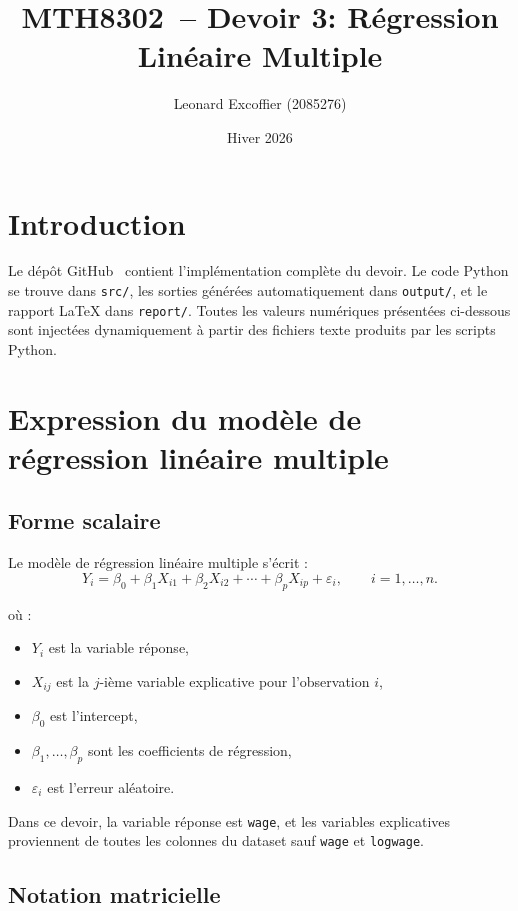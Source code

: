 \documentclass[12pt,letterpaper]{article}
\title{MTH8302~-- Devoir 3: Régression Linéaire Multiple}
\author{Leonard Excoffier (2085276)}
\date{Hiver 2026}
\begin{document}
\maketitle
\tableofcontents

\section*{Introduction}

Le dépôt GitHub~\cite{repo} contient l'implémentation complète du devoir.
Le code Python se trouve dans \texttt{src/}, les sorties générées automatiquement dans \texttt{output/}, et le rapport LaTeX dans \texttt{report/}.
Toutes les valeurs numériques présentées ci-dessous sont injectées dynamiquement à partir des fichiers texte produits par les scripts Python.

\section{Expression du modèle de régression linéaire multiple}

\subsection{Forme scalaire}

Le modèle de régression linéaire multiple s'écrit :
\[
Y_i = \beta_0 + \beta_1 X_{i1} + \beta_2 X_{i2} + \cdots + \beta_p X_{ip} + \varepsilon_i,
\qquad i = 1, \ldots, n.
\]

où :
\begin{itemize}
    \item $Y_i$ est la variable réponse,
    \item $X_{ij}$ est la $j$-ième variable explicative pour l'observation $i$,
    \item $\beta_0$ est l'intercept,
    \item $\beta_1,\ldots,\beta_p$ sont les coefficients de régression,
    \item $\varepsilon_i$ est l'erreur aléatoire.
\end{itemize}

Dans ce devoir, la variable réponse est \texttt{wage}, et les variables explicatives proviennent de toutes les colonnes du dataset sauf \texttt{wage} et \texttt{logwage}.

\subsection{Notation matricielle}
\end{document}
